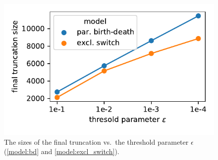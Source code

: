 \begin{figure}
    \centering
    \includegraphics[scale=.8]{gfx/trunc_sizes.pdf}
	\caption[The sizes of the final truncation v.\ the threshold parameter $\epsilon$]{The sizes of the final truncation vs.\ the threshold parameter $\epsilon$ (\autoref{model:bd} and \autoref{model:excl_switch}).}
    \label{fig:excl_switch:trunc_sizes}
\end{figure}
